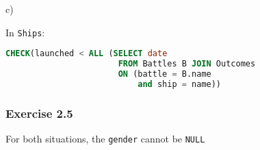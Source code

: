 \documentclass[../../main.tex]{subfiles}
\begin{document}
c)

In \verb|Ships|:

\begin{lstlisting}[language=sql]
  CHECK(launched < ALL (SELECT date
                       FROM Battles B JOIN Outcomes
                       ON (battle = B.name
                           and ship = name))
\end{lstlisting}

\subsubsection*{Exercise 2.5}

For both situations, the \verb|gender| cannot be \verb|NULL|
\end{document}

